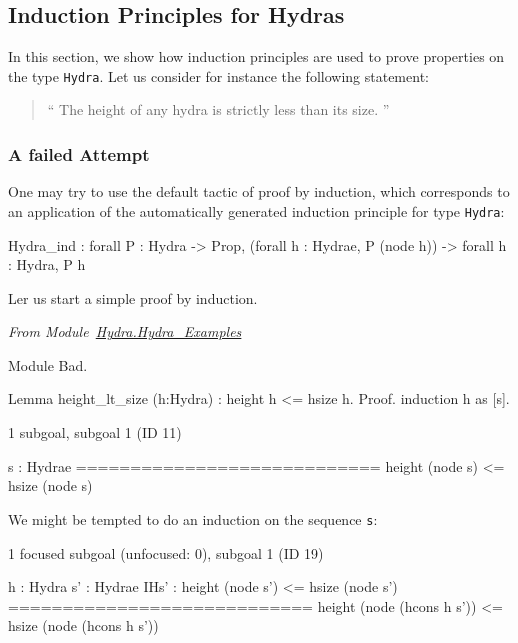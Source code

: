 \subsection{Induction Principles for Hydras}
\label{sec:orgheadline42}


In this section, we show how induction principles are used to prove properties on the type 
\texttt{Hydra}. Let us consider for instance the following statement:
\begin{quote}
  `` The height of any hydra is strictly less than its size. ''
\end{quote}



\subsubsection{A failed Attempt}

One may try to use the default tactic of proof by induction, which corresponds to an application of the automatically  generated  induction principle for  type \texttt{Hydra}:

\begin{Coqanswer}
Hydra_ind :
forall P : Hydra -> Prop,
(forall h : Hydrae, P (node h)) -> forall h : Hydra, P h
\end{Coqanswer}

Ler us start a simple proof by induction.

\vspace{4pt}
\noindent
\emph{From Module~\href{../theories/html/hydras.Hydra.Hydra_Examples.html}{Hydra.Hydra\_Examples}}

\begin{Coqbad}
Module Bad.

Lemma height_lt_size (h:Hydra) :
  height h <= hsize h.
Proof.
  induction h as [s].
\end{Coqbad}

\begin{Coqanswer}
1 subgoal, subgoal 1 (ID 11)
  
  s : Hydrae
  ============================
   height (node s) <= hsize (node s)
\end{Coqanswer}

We might be tempted to do an induction on the sequence \texttt{s}:



\begin{Coqanswer}
 1 focused subgoal
(unfocused: 0), subgoal 1 (ID 19)
  
  h : Hydra
  s' : Hydrae
  IHs' : height (node s') <= hsize (node s')
  ============================
   height (node (hcons h s')) <= hsize (node (hcons h s'))

\end{Coqanswer}

